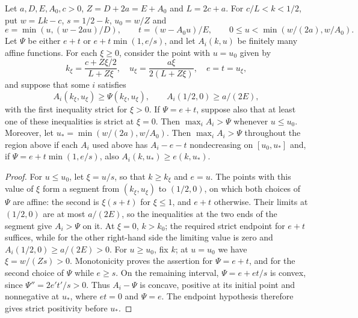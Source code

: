 \begin{lemma}
\label{gap396:affine-cap-witness}
Let $a,D,E,A_0,c>0$, $Z=D+2a=E+A_0$ and $L=2c+a$.
For $c/L<k<1/2$, put $w=Lk-c$, $s=1/2-k$, $u_0=w/Z$ and
\[
 e=\min(u,(w-2au)/D),\qquad t=(w-A_0u)/E,
 \qquad 0\le u<\min(w/(2a),w/A_0).
\]
Let $\Psi$ be either $e+t$ or $e+t\min(1,e/s)$,
and let $A_i(k,u)$ be finitely many affine functions. For each $\xi\ge0$,
consider the point with $u=u_0$ given by
\[
 k_\xi=\frac{c+Z\xi/2}{L+Z\xi},\quad
 u_\xi=\frac{a\xi}{2(L+Z\xi)},\quad e=t=u_\xi,
\]
and suppose that some $i$ satisfies
\[
 A_i(k_\xi,u_\xi)\ge\Psi(k_\xi,u_\xi),\qquad
 A_i(1/2,0)\ge a/(2E),
\]
with the first inequality strict for $\xi>0$.
If $\Psi=e+t$, suppose also that at least one of these inequalities is strict at $\xi=0$.
Then $\max_iA_i>\Psi$ whenever $u\le u_0$.
Moreover, let $u_*=\min(w/(2a),w/A_0)$.
Then $\max_iA_i>\Psi$ throughout the region above if each $A_i$ used above has
$A_i-e-t$ nondecreasing on $[u_0,u_*]$ and, if $\Psi=e+t\min(1,e/s)$, also $A_i(k,u_*)\ge e(k,u_*)$.
\end{lemma}
\begin{proof}
For $u\le u_0$, let $\xi=u/s$, so that $k\ge k_\xi$ and $e=u$. The points with this value of $\xi$ form a segment from $(k_\xi,u_\xi)$ to $(1/2,0)$, on which
both choices of $\Psi$ are affine:
the second is $\xi(s+t)$ for $\xi\le1$, and $e+t$ otherwise.
Their limits at $(1/2,0)$ are at most $a/(2E)$, so the inequalities at the two ends of the segment
give $A_i>\Psi$ on it. At $\xi=0$, $k>k_0$;
the required strict endpoint for $e+t$ suffices, while for the
other right-hand side the limiting value is zero and
$A_i(1/2,0)\ge a/(2E)>0$.
For $u\ge u_0$, fix $k$; at $u=u_0$ we have
$\xi=w/(Zs)>0$. Monotonicity proves the assertion for $\Psi=e+t$,
and for the second choice of $\Psi$ while $e\ge s$.
On the remaining interval, $\Psi=e+et/s$ is convex, since
$\Psi''=2e't'/s>0$. Thus $A_i-\Psi$ is concave, positive at its
initial point and nonnegative at $u_*$, where $et=0$ and
$\Psi=e$. The endpoint hypothesis therefore gives strict positivity before $u_*$.
\end{proof}


